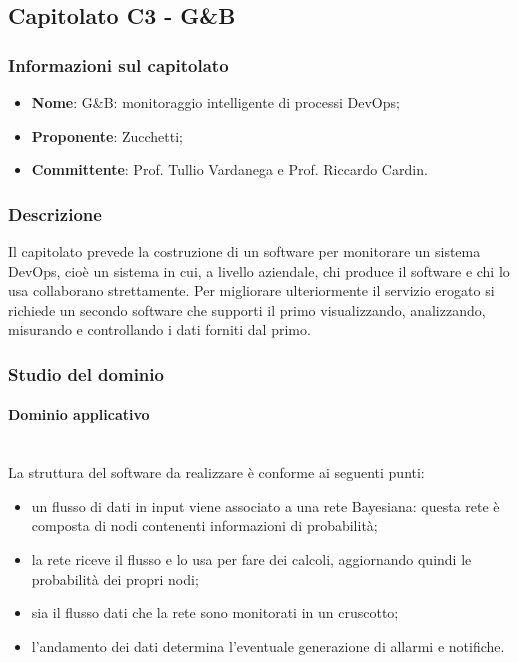 \subsection{Capitolato C3 - G\&B}
\subsubsection{Informazioni sul capitolato}
\begin{itemize}
	\item \textbf{Nome}: G\&B: monitoraggio intelligente di processi DevOps;
	\item \textbf{Proponente}: Zucchetti;
	\item \textbf{Committente}: Prof. Tullio Vardanega e Prof. Riccardo Cardin.
\end{itemize}
\subsubsection{Descrizione}
Il capitolato prevede la costruzione di un software per monitorare un sistema 
DevOps, cioè un sistema in cui, a livello aziendale, chi produce il software 
e chi lo usa collaborano strettamente. Per migliorare ulteriormente il servizio 
erogato si richiede un secondo software che supporti il primo visualizzando, 
analizzando, misurando e controllando i dati forniti dal primo.
\subsubsection{Studio del dominio}
\paragraph{Dominio applicativo} \mbox{}\\
La struttura del software da realizzare è conforme ai seguenti punti: 
\begin{itemize}
	\item un flusso di dati in input viene associato a una rete Bayesiana: 
	questa rete è composta di nodi contenenti informazioni di probabilità;
	\item la rete riceve il flusso e lo usa per fare dei calcoli, aggiornando
	 quindi le probabilità dei propri nodi;
	\item sia il flusso dati che la rete sono monitorati in un cruscotto;
	\item l'andamento dei dati determina l'eventuale generazione di allarmi
	 e notifiche.
\end{itemize}
